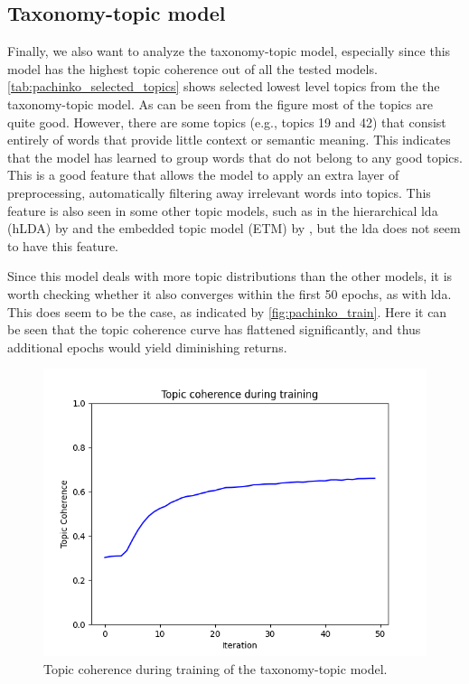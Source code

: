 \subsection{Taxonomy-topic model}\label{sec:taxonomy_analysis}
Finally, we also want to analyze the taxonomy-topic model, especially since this model has the highest topic coherence out of all the tested models.
\autoref{tab:pachinko_selected_topics} shows selected lowest level topics from the the taxonomy-topic model.
As can be seen from the figure most of the topics are quite good. 
However, there are some topics (e.g., topics 19 and 42) that consist entirely of words that provide little context or semantic meaning.
This indicates that the model has learned to group words that do not belong to any good topics.
This is a good feature that allows the model to apply an extra layer of preprocessing, automatically filtering away irrelevant words into topics.
This feature is also seen in some other topic models, such as in the hierarchical \gls{lda} (hLDA) by \citet{hLDA2004} and the embedded topic model (ETM) by \citet{dieng2020topic}, but the \gls{lda} does not seem to have this feature.

Since this model deals with more topic distributions than the other models, it is worth checking whether it also converges within the first 50 epochs, as with \gls{lda}.
This does seem to be the case, as indicated by \autoref{fig:pachinko_train}.
Here it can be seen that the topic coherence curve has flattened significantly, and thus additional epochs would yield diminishing returns.

\begin{figure}
	\centering
	\includegraphics[width= \linewidth]{figures/pachinko_training.PNG}
	\caption{Topic coherence during training of the taxonomy-topic model.}
	\label{fig:pachinko_train}
\end{figure}


